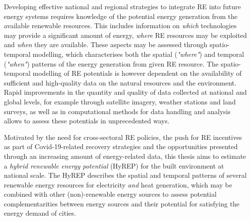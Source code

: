 Developing effective national and regional strategies to integrate RE into future energy systems requires knowledge of the potential energy generation from the available renewable resources. 
This includes information on \textit{which} technologies may provide a significant amount of energy, \textit{where} RE resources may be exploited and \textit{when} they are available. 
These aspects may be assessed through spatio-temporal modelling, which characterises both the spatial (\textit{"where"}) and temporal (\textit{"when"}) patterns of the energy generation from given RE resource.
The spatio-temporal modelling of RE potentials is however dependent on the availability of sufficient and high-quality data on the natural resources and the environment.
Rapid improvements in the quantity and quality of data collected at national and global levels, for example through satellite imagery, weather stations and land surveys, as well as in computational methods for data handling and analysis allows to assess these potentials in unprecedented ways.

Motivated by the need for cross-sectoral RE policies, the push for RE incentives as part of  Covid-19-related recovery strategies and the opportunities presented through an increasing amount of energy-related data, this thesis aims to estimate a \textit{hybrid renewable energy potential} (HyREP) for the built environment at national scale. 
The HyREP describes the spatial and temporal patterns of several renewable energy resources for electricity \textit{and} heat generation, which may be combined with other (non)-renewable energy sources to assess potential complementarities between energy sources and their potential for satisfying the energy demand of cities. 


